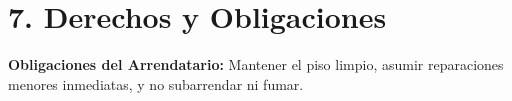 \section*{7. Derechos y Obligaciones}
\textbf{Obligaciones del Arrendatario:} Mantener el piso limpio, asumir reparaciones menores inmediatas, y no subarrendar ni fumar.
